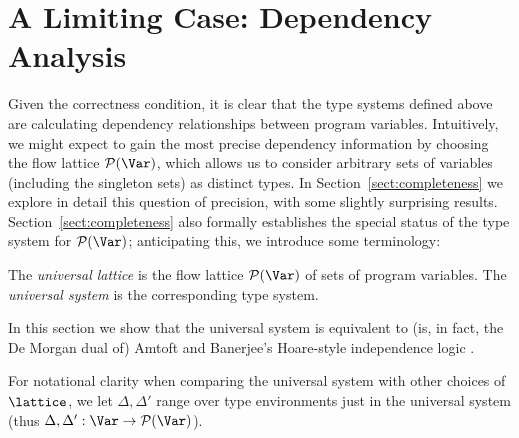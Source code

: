 \documentclass{sigplanconf}
\newcommand{\pset}{\mathcal{P}}
\begin{document}
\section{A Limiting Case: Dependency Analysis}
Given the correctness condition, it is clear that the type systems defined above
are calculating dependency relationships between program variables.
Intuitively, we might expect to gain the most precise dependency information by choosing the flow
lattice $\pset(\Var)$, which allows us to consider arbitrary sets of variables (including the singleton sets)
as distinct types.
In Section~\ref{sect:completeness}
we explore in detail this question of precision, with some slightly
surprising results.
Section~\ref{sect:completeness} also
formally establishes the special status of the type system for $\pset(\Var)$;
anticipating this, we introduce some terminology:
\begin{definition}
The \emph{universal lattice} is the flow lattice $\pset(\Var)$ of sets of program variables.
The \emph{universal system} is the corresponding type system.
\end{definition}
In this section we show that the universal system is equivalent to (is, in fact, the De Morgan dual of)
Amtoft and Banerjee's Hoare-style independence logic \cite{Amtoft:Banerjee:SAS04}.

For notational clarity when comparing
the universal system with other choices of $\lattice$, we let $\Delta, \Delta'$ range over type
environments just in the universal system (thus
$\Delta, \Delta': \Var \rightarrow \pset(\Var)$).



\pagebreak
\end{document}
